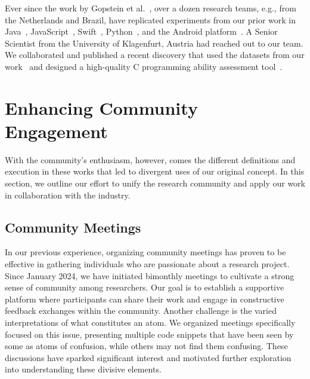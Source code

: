 \documentclass[conference]{IEEEtran}
\begin{document}
Ever since the work by Gopstein et al.~\cite{gopstein2017understanding}, over a dozen research teams, e.g., from the Netherlands and Brazil, have replicated experiments from our prior work in Java~\cite{langhout2021atoms, mendes2022dazed}, JavaScript~\cite{oliveira2019impact},  Swift~\cite{castor2018identifying}, Python~\cite{da2023seeing}, and the Android platform~\cite{tabosa2024dataset}.  A Senior Scientist from the University of Klagenfurt, Austria had reached out to our team. We collaborated and published a recent discovery that used the datasets from our work~\cite{gopstein2017understanding, zhuang2023developer} and designed a high-quality C programming ability assessment tool~\cite{glasauer2024c}.

\section{Enhancing Community Engagement}

With the community's enthusiasm, however, comes the different definitions and execution in these works that led to divergent uses of our original concept. In this section, we outline our effort to unify the research community and apply our work in collaboration with the industry.

\subsection{Community Meetings}
In our previous experience, organizing community meetings has 
proven to be effective in gathering individuals who 
are passionate about a research project. 
Since January 2024, we have initiated bimonthly meetings 
to cultivate a strong sense of community among researchers. 
Our goal is to establish 
a supportive platform where  participants can share 
their work and engage in constructive feedback exchanges 
within the community.
%
%
Another challenge is the varied interpretations 
of what constitutes an atom. We organized 
meetings specifically focused on this issue, presenting 
multiple code snippets that have been seen by some as atoms of 
confusion, while others may not find them confusing. These 
discussions have sparked significant interest and motivated 
further exploration into understanding these divisive 
elements.
\end{document}
